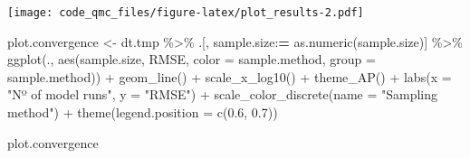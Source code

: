 \documentclass[
  11pt,
]{article}
\newenvironment{Shaded}{\begin{snugshade}}{\end{snugshade}}
\newcommand{\AttributeTok}[1]{\textcolor[rgb]{0.77,0.63,0.00}{#1}}
\newcommand{\CommentTok}[1]{\textcolor[rgb]{0.56,0.35,0.01}{\textit{#1}}}
\newcommand{\DecValTok}[1]{\textcolor[rgb]{0.00,0.00,0.81}{#1}}
\newcommand{\ErrorTok}[1]{\textcolor[rgb]{0.64,0.00,0.00}{\textbf{#1}}}
\newcommand{\FloatTok}[1]{\textcolor[rgb]{0.00,0.00,0.81}{#1}}
\newcommand{\FunctionTok}[1]{\textcolor[rgb]{0.00,0.00,0.00}{#1}}
\newcommand{\NormalTok}[1]{#1}
\newcommand{\OtherTok}[1]{\textcolor[rgb]{0.56,0.35,0.01}{#1}}
\newcommand{\SpecialCharTok}[1]{\textcolor[rgb]{0.00,0.00,0.00}{#1}}
\newcommand{\StringTok}[1]{\textcolor[rgb]{0.31,0.60,0.02}{#1}}
\begin{document}
\begin{Shaded}
\end{Shaded}

\texttt{[image: code\_qmc\_files/figure-latex/plot\_results-2.pdf]}

\begin{Shaded}
\begin{Highlighting}[]
\NormalTok{plot.convergence }\OtherTok{\textless{}{-}}\NormalTok{ dt.tmp }\SpecialCharTok{\%\textgreater{}\%}
\NormalTok{  .[, sample.size}\SpecialCharTok{:}\ErrorTok{=} \FunctionTok{as.numeric}\NormalTok{(sample.size)] }\SpecialCharTok{\%\textgreater{}\%}
  \FunctionTok{ggplot}\NormalTok{(., }\FunctionTok{aes}\NormalTok{(sample.size, RMSE, }\AttributeTok{color =}\NormalTok{ sample.method, }\AttributeTok{group =}\NormalTok{ sample.method)) }\SpecialCharTok{+}
  \FunctionTok{geom\_line}\NormalTok{() }\SpecialCharTok{+}
  \FunctionTok{scale\_x\_log10}\NormalTok{() }\SpecialCharTok{+}
  \FunctionTok{theme\_AP}\NormalTok{() }\SpecialCharTok{+}
  \FunctionTok{labs}\NormalTok{(}\AttributeTok{x =} \StringTok{"Nº of model runs"}\NormalTok{, }\AttributeTok{y =} \StringTok{"RMSE"}\NormalTok{) }\SpecialCharTok{+}
  \FunctionTok{scale\_color\_discrete}\NormalTok{(}\AttributeTok{name =} \StringTok{"Sampling method"}\NormalTok{) }\SpecialCharTok{+}
  \FunctionTok{theme}\NormalTok{(}\AttributeTok{legend.position =} \FunctionTok{c}\NormalTok{(}\FloatTok{0.6}\NormalTok{, }\FloatTok{0.7}\NormalTok{))}

\NormalTok{plot.convergence}
\end{Highlighting}
\end{Shaded}
\end{document}
